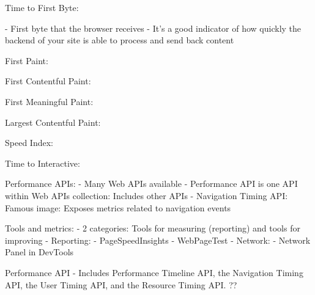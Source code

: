 Time to First Byte: %

- First byte that the browser receives
- It’s a good indicator of how quickly the backend of your site is able to process and send back content








First Paint: %


First Contentful Paint: %


First Meaningful Paint: %


Largest Contentful Paint: %


Speed Index: %


Time to Interactive: %













Performance APIs:
- Many Web APIs available %
- Performance API is one API within Web APIs collection: Includes other APIs
- Navigation Timing API: Famous image: Exposes metrics related to navigation events

Tools and metrics:
- 2 categories: Tools for measuring (reporting) and tools for improving
- Reporting:
- PageSpeedInsights
- WebPageTest
- Network:
- Network Panel in DevTools





Performance API %
- Includes Performance Timeline API, the Navigation Timing API, the User Timing API, and the Resource Timing API.  ??



